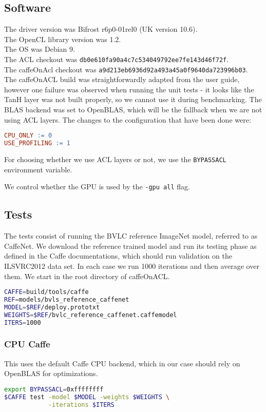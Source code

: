 \documentclass[12pt, a4paper, notitlepage]{report}
\begin{document}
\subsection*{Software}
The driver version was Bifrost r6p0-01rel0 (UK version 10.6).\\
The OpenCL library version was 1.2.\\
The OS was Debian 9.\\
The ACL checkout was \texttt{db0e610fa90a4c7c534049792ee7fe143d46f72f}.\\
The caffeOnAcl checkout was \texttt{a9d213eb6936d92a493a45a0f9640da723996b03}.\\
The caffeOnACL build was straightforwardly adapted from the user guide, however one failure was observed when running the unit tests - it looks like the TanH layer was not built properly, so we cannot use it during benchmarking. The BLAS backend was set to OpenBLAS, which will be the fallback when we are not using ACL layers. The changes to the configuration that have been done were:
\begin{lstlisting}[language=make]
CPU_ONLY := 0
USE_PROFILING := 1
\end{lstlisting}

For choosing whether we use ACL layers or not, we use the \verb|BYPASSACL| environment variable.

We control whether the GPU is used by the \verb|-gpu all| flag.\cite{coacl}

\subsection*{Tests}
The tests consist of running the BVLC reference ImageNet model, referred to as CaffeNet. We download the reference trained model and run its testing phase as defined in the Caffe documentations, which should run validation on the ILSVRC2012 data set. In each case we run 1000 iterations and then average over them.\cite{caffe}
We start in the root directory of caffeOnACL.
\begin{lstlisting}[language=bash]
CAFFE=build/tools/caffe
REF=models/bvls_reference_caffenet
MODEL=$REF/deploy.prototxt
WEIGHTS=$REF/bvlc_reference_caffenet.caffemodel
ITERS=1000
\end{lstlisting}
\subsubsection*{CPU Caffe}
This uses the default Caffe CPU backend, which in our case should rely on OpenBLAS for optimizations.
\begin{lstlisting}[language=bash]
export BYPASSACL=0xffffffff
$CAFFE test -model $MODEL -weights $WEIGHTS \
            -iterations $ITERS
\end{lstlisting}
\end{document}
